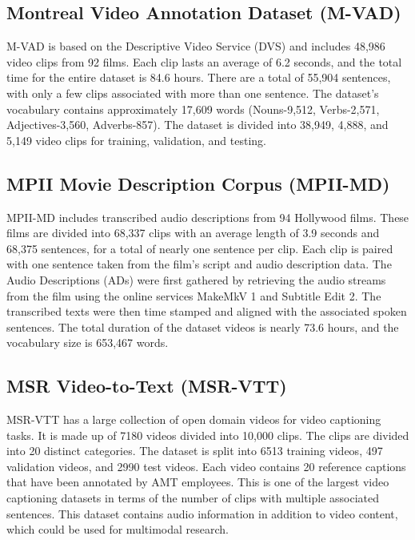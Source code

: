 \subsection{Montreal Video Annotation Dataset (M-VAD)}

\par M-VAD is based on the Descriptive Video Service (DVS) and includes 48,986 video clips from 92 films. Each clip lasts an average of 6.2 seconds, and the total time for the entire dataset is 84.6 hours. There are a total of 55,904 sentences, with only a few clips associated with more than one sentence. The dataset's vocabulary contains approximately 17,609 words (Nouns-9,512, Verbs-2,571, Adjectives-3,560, Adverbs-857). The dataset is divided into 38,949, 4,888, and 5,149 video clips for training, validation, and testing.


\subsection{MPII Movie Description Corpus (MPII-MD)}

\par MPII-MD includes transcribed audio descriptions from 94 Hollywood films. These films are divided into 68,337 clips with an average length of 3.9 seconds and 68,375 sentences, for a total of nearly one sentence per clip. Each clip is paired with one sentence taken from the film's script and audio description data. The Audio Descriptions (ADs) were first gathered by retrieving the audio streams from the film using the online services MakeMkV 1 and Subtitle Edit 2. The transcribed texts were then time stamped and aligned with the associated spoken sentences. The total duration of the dataset videos is nearly 73.6 hours, and the vocabulary size is 653,467 words.

\subsection{MSR Video-to-Text (MSR-VTT)}

\par MSR-VTT has a large collection of open domain videos for video captioning tasks. It is made up of 7180 videos divided into 10,000 clips. The clips are divided into 20 distinct categories. The dataset is split into 6513 training videos, 497 validation videos, and 2990 test videos. Each video contains 20 reference captions that have been annotated by AMT employees. This is one of the largest video captioning datasets in terms of the number of clips with multiple associated sentences. This dataset contains audio information in addition to video content, which could be used for multimodal research.

